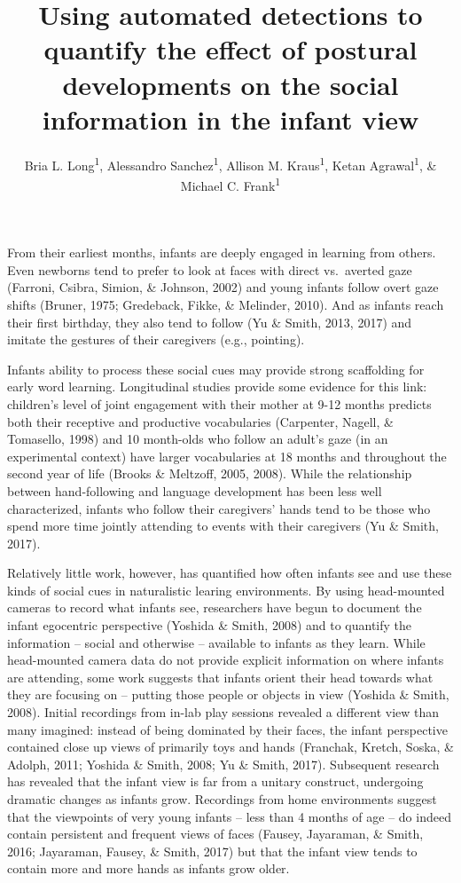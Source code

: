 \documentclass[english,man]{apa6}
\author{Bria L. Long\textsuperscript{1}, Alessandro Sanchez\textsuperscript{1}, Allison M. Kraus\textsuperscript{1}, Ketan Agrawal\textsuperscript{1}, \& Michael C. Frank\textsuperscript{1}}
\affiliation{
\vspace{0.5cm}
\textsuperscript{1} Department of Psychology, Stanford University}
\title{Using automated detections to quantify the effect of postural
developments on the social information in the infant view}
\date{}
\begin{document}
\maketitle

From their earliest months, infants are deeply engaged in learning from
others. Even newborns tend to prefer to look at faces with direct
vs.~averted gaze (Farroni, Csibra, Simion, \& Johnson, 2002) and young
infants follow overt gaze shifts (Bruner, 1975; Gredeback, Fikke, \&
Melinder, 2010). And as infants reach their first birthday, they also
tend to follow (Yu \& Smith, 2013, 2017) and imitate the gestures of
their caregivers (e.g., pointing).

Infants ability to process these social cues may provide strong
scaffolding for early word learning. Longitudinal studies provide some
evidence for this link: children's level of joint engagement with their
mother at 9-12 months predicts both their receptive and productive
vocabularies (Carpenter, Nagell, \& Tomasello, 1998) and 10 month-olds
who follow an adult's gaze (in an experimental context) have larger
vocabularies at 18 months and throughout the second year of life (Brooks
\& Meltzoff, 2005, 2008). While the relationship between hand-following
and language development has been less well characterized, infants who
follow their caregivers' hands tend to be those who spend more time
jointly attending to events with their caregivers (Yu \& Smith, 2017).

Relatively little work, however, has quantified how often infants see
and use these kinds of social cues in naturalistic learing environments.
By using head-mounted cameras to record what infants see, researchers
have begun to document the infant egocentric perspective (Yoshida \&
Smith, 2008) and to quantify the information -- social and otherwise --
available to infants as they learn. While head-mounted camera data do
not provide explicit information on where infants are attending, some
work suggests that infants orient their head towards what they are
focusing on -- putting those people or objects in view (Yoshida \&
Smith, 2008). Initial recordings from in-lab play sessions revealed a
different view than many imagined: instead of being dominated by their
faces, the infant perspective contained close up views of primarily toys
and hands (Franchak, Kretch, Soska, \& Adolph, 2011; Yoshida \& Smith,
2008; Yu \& Smith, 2017). Subsequent research has revealed that the
infant view is far from a unitary construct, undergoing dramatic changes
as infants grow. Recordings from home environments suggest that the
viewpoints of very young infants -- less than 4 months of age -- do
indeed contain persistent and frequent views of faces (Fausey,
Jayaraman, \& Smith, 2016; Jayaraman, Fausey, \& Smith, 2017) but that
the infant view tends to contain more and more hands as infants grow
older.
\end{document}
